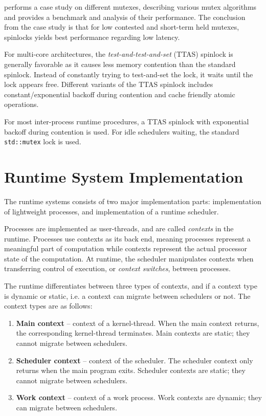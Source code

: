  performs a case study on different mutexes, describing various mutex algorithms and provides a benchmark and analysis of their performance. The conclusion from the case study is that for low contested and short\hyp{}term held mutexes, spinlocks yields best performance regarding low latency. 

For multi\hyp{}core architectures, the \textit{test\hyp{}and\hyp{}test\hyp{}and\hyp{}set} (TTAS) spinlock is generally favorable as it causes less memory contention than the standard spinlock. Instead of constantly trying to test\hyp{}and\hyp{}set the lock, it waits until the lock appears free. Different variants of the TTAS spinlock includes constant/exponential backoff during contention and cache friendly atomic operations.

For most inter\hyp{}process runtime procedures, a TTAS spinlock with exponential backoff during contention is used. For idle schedulers waiting, the standard \lstinline[style={CustomC++}]|std::mutex| lock is used.


\section{Runtime System Implementation}
\label{sec:runtime_system_implementation}


The runtime systems consists of two major implementation parts: implementation of lightweight processes, and implementation of a runtime scheduler.

Processes are implemented as user\hyp{}threads, and are called \textit{contexts} in the runtime. Processes use contexts as its back end, meaning processes represent a meaningful part of computation while contexts represent the actual processor state of the computation. At runtime, the scheduler manipulates contexts when transferring control of execution, or \textit{context switches}, between processes. 

The runtime differentiates between three types of contexts, and if a context type is dynamic or static, i.e. a context can migrate between schedulers or not. The context types are as follows:

\begin{enumerate}[topsep=0em,itemsep=-1em,partopsep=0.5em,parsep=1em]
    \item \textbf{Main context} -- context of a kernel\hyp{}thread. When the main context returns, the corresponding kernel\hyp{}thread terminates. Main contexts are static; they cannot migrate between schedulers.
    \item \textbf{Scheduler context} -- context of the scheduler. The scheduler context only returns when the main program exits. Scheduler contexts are static; they cannot migrate between schedulers.
    \item \textbf{Work context} -- context of a work process. Work contexts are dynamic; they can migrate between schedulers.
\end{enumerate}


